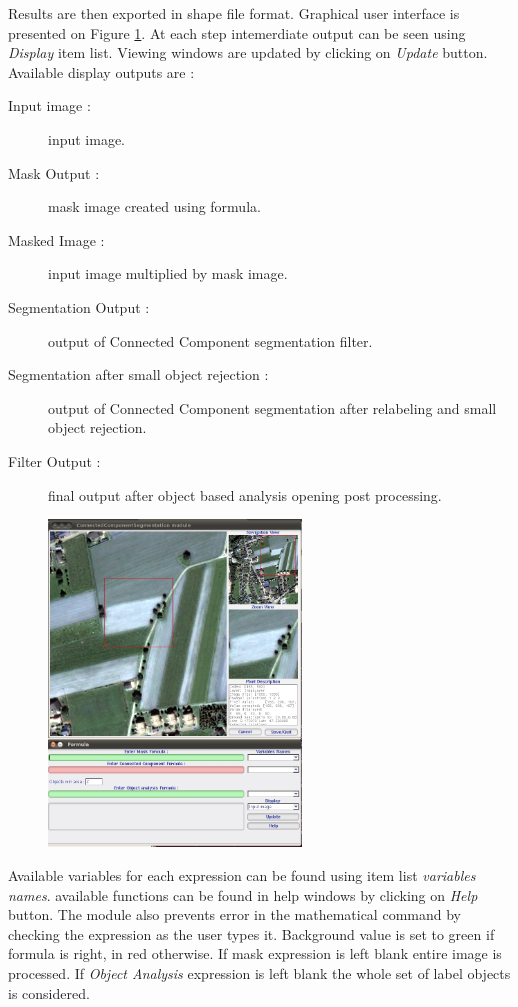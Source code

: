 Results are then exported in shape file format. Graphical user interface is presented on Figure \ref{fig:connected_component_module}. At each step intemerdiate output can be seen using \emph{Display} item list. Viewing windows are updated by clicking on \emph{Update} button. Available display outputs are :

\begin{description}
\item[Input image :] input image.
\item[Mask Output :] mask image created using formula.
\item[Masked Image :] input image multiplied by mask image.
\item[Segmentation Output :] output of Connected Component segmentation filter.
\item[Segmentation after small object rejection :] output of Connected Component segmentation after relabeling and small object rejection.
\item[Filter Output :] final output after object based analysis opening post processing. 
\end{description}

\begin{figure}
  \center
  \includegraphics[width=0.6\textwidth]{../Art/MonteverdiImages/monteverdi_connected_component_segmentation.png}
  \label{fig:connected_component_module}
\end{figure}

Available variables for each expression can be found using item list \emph{variables names}. available functions can  be found in help windows by clicking on \emph{Help} button. The module also prevents error in the mathematical command by checking the expression as the user types it. Background value is set to green if formula is right, in red otherwise. If mask expression is left blank entire image is processed. If \emph{Object Analysis} expression is left blank the whole set of label objects is considered.

